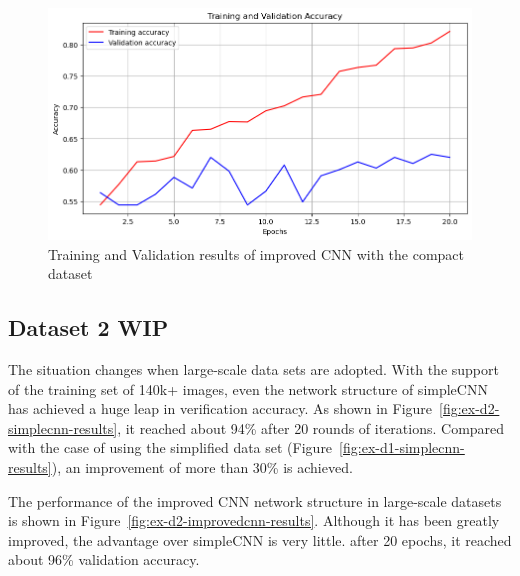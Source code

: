 \documentclass[final]{cvpr}
\begin{document}
\begin{figure}[t]
   \centering
   \includegraphics[width=0.9\linewidth]{img/ex-d1-improvedcnn-accuracy-results.png}
   \caption{Training and Validation results of improved CNN with the compact dataset}
   \label{fig:ex-d1-improvedcnn-results}
\end{figure}



\subsection{Dataset 2 WIP}

The situation changes when large-scale data sets are adopted. With the support of the training set of 140k+ images, even the network structure of simpleCNN has achieved a huge leap in verification accuracy. As shown in Figure~\ref*{fig:ex-d2-simplecnn-results}, it reached about 94\% after 20 rounds of iterations. Compared with the case of using the simplified data set (Figure~\ref*{fig:ex-d1-simplecnn-results}), an improvement of more than 30\% is achieved.

The performance of the improved CNN network structure in large-scale datasets is shown in Figure~\ref*{fig:ex-d2-improvedcnn-results}. Although it has been greatly improved, the advantage over simpleCNN is very little. after 20 epochs, it reached about 96\% validation accuracy.
\end{document}

